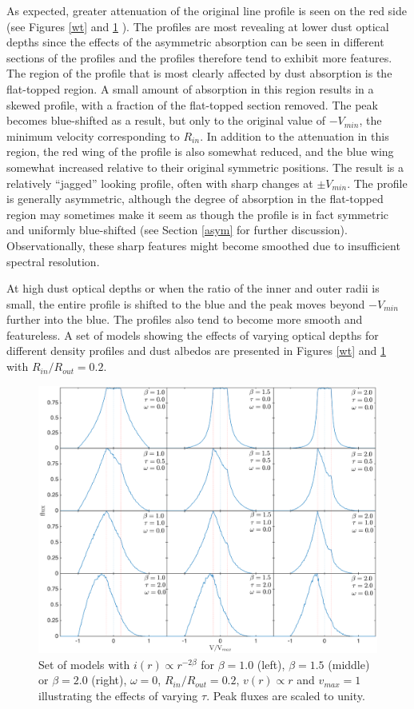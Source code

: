 As expected, greater attenuation of the original line profile is seen on 
the red side (see Figures \ref{wt} and \ref{bt} ).  The profiles are most 
revealing at lower dust optical depths since the effects of the asymmetric 
absorption can be seen in different sections of the profiles and the 
profiles therefore tend to exhibit more features. The region of the 
profile that is most clearly affected by dust absorption is the 
flat-topped region.  A small amount of absorption in this region results 
in a skewed profile, with a fraction of the flat-topped section removed.  
The peak becomes blue-shifted as a result, but only to the original value 
of $-V_{min}$, the minimum velocity corresponding to $R_{in}$. In addition 
to the attenuation in this region, the red wing of the profile is also 
somewhat reduced, and the blue wing somewhat increased relative to their 
original symmetric positions.  The result is a relatively ``jagged'' 
looking profile, often with sharp changes at $\pm V_{min}$.  The profile 
is generally asymmetric, although the degree of absorption in the 
flat-topped region may sometimes make it seem as though the profile is in 
fact symmetric and uniformly blue-shifted (see Section \ref{asym} for 
further discussion).  Observationally, these sharp features might become 
smoothed due to insufficient spectral resolution.

At high dust optical depths or when the ratio of the inner and outer radii 
is small, the entire profile is shifted to the blue and the peak moves 
beyond $-V_{min}$ further into the blue.  The profiles also tend to become 
more smooth and featureless.  A set of models showing the effects of 
varying optical depths for different density profiles and dust albedos are 
presented in Figures \ref{wt} and \ref{bt} with $R_{in}/R_{out} = 0.2$.

\begin{figure}
\centering
\includegraphics[trim =77 0 6 15,clip=true,scale=0.44]{chapters/chapter4/images/params/D/D_all}
\caption{Set of models with $i(r) \propto r^{-2\beta}$ for $\beta=1.0$ (left), $\beta=1.5$ (middle) or $\beta=2.0$ (right), $\omega=0$, 
$R_{in}/R_{out}=0.2$, $v(r) \propto r$ and $v_{max}=1$ illustrating the effects of varying 
$\tau$.  Peak fluxes are scaled to unity.}
\label{bt}
\end{figure}


